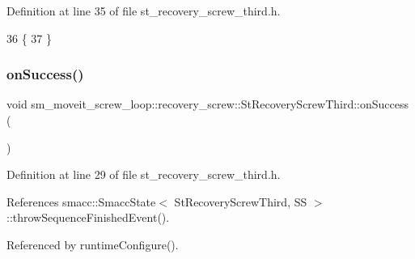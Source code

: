 Definition at line 35 of file st\+\_\+recovery\+\_\+screw\+\_\+third.\+h.


\begin{DoxyCode}
36             \{
37             \}
\end{DoxyCode}
\mbox{\label{structsm__moveit__screw__loop_1_1recovery__screw_1_1StRecoveryScrewThird_aac52f3cc2d70c30eeab123f065ac554f}} 
\subsubsection{\texorpdfstring{on\+Success()}{onSuccess()}}
{\footnotesize\ttfamily void sm\+\_\+moveit\+\_\+screw\+\_\+loop\+::recovery\+\_\+screw\+::\+St\+Recovery\+Screw\+Third\+::on\+Success (\begin{DoxyParamCaption}{ }\end{DoxyParamCaption})\hspace{0.3cm}{\ttfamily [inline]}}



Definition at line 29 of file st\+\_\+recovery\+\_\+screw\+\_\+third.\+h.



References smacc\+::\+Smacc\+State$<$ St\+Recovery\+Screw\+Third, S\+S $>$\+::throw\+Sequence\+Finished\+Event().



Referenced by runtime\+Configure().


